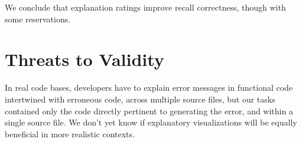 \documentclass[conference]{IEEEtran}
\begin{document}
We conclude that explanation ratings improve recall correctness, though with some reservations.



\section{Threats to Validity}
\label{sec:threats}


In real code bases, developers have to explain error messages in functional code intertwined with erroneous code, across multiple source files, but our tasks contained only the code directly pertinent to generating the error, and within a single source file. We don't yet know if explanatory visualizations will be equally beneficial in more realistic contexts.
\end{document}
